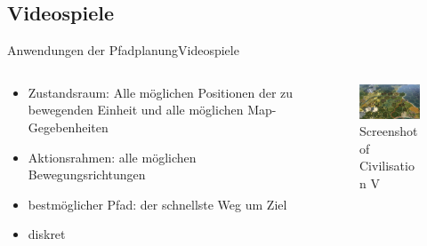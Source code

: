 \documentclass[t,aspectratio=169,dvipsnames]{beamer}
\begin{document}
\subsection{Videospiele}
\begin{frame}{Anwendungen der Pfadplanung}{Videospiele}
	\begin{columns}
		\begin{column}[T]{0.5\textwidth}
			\begin{itemize}
				\item Zustandsraum: Alle möglichen Positionen der zu bewegenden Einheit und alle möglichen Map-Gegebenheiten
				\item Aktionsrahmen: alle möglichen Bewegungsrichtungen
				\item bestmöglicher Pfad: der schnellste Weg um Ziel
				\item diskret
			\end{itemize}
		\end{column}
		\begin{column}[T]{0.5\textwidth}
			\begin{figure}
				\includegraphics[width=6.0cm]{images/Civ5.png}
				\caption{Screenshot of Civilisation V} 
			\end{figure}
		\end{column}
	\end{columns}
\end{frame}
\end{document}

